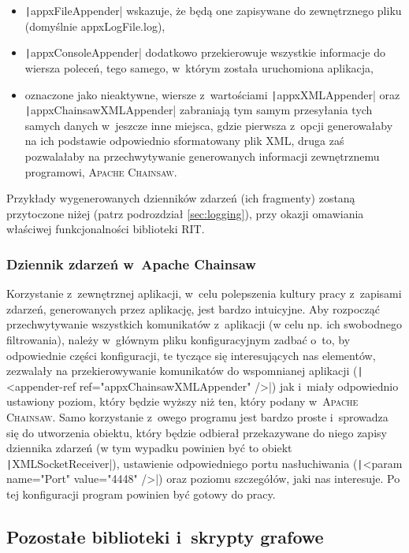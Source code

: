 \begin{itemize}
	\item \texttt|appxFileAppender| wskazuje, że będą one zapisywane do zewnętrznego pliku (domyślnie \textsf{appxLogFile.log}),
	\item \texttt|appxConsoleAppender|  dodatkowo przekierowuje wszystkie informacje do wiersza poleceń, tego samego, w~którym została uruchomiona aplikacja,
	\item oznaczone jako nieaktywne, wiersze z~wartościami \texttt|appxXMLAppender| oraz \texttt|appxChainsawXMLAppender| zabraniają tym samym przesyłania tych samych danych w~jeszcze inne miejsca, gdzie pierwsza z~opcji generowałaby na ich podstawie odpowiednio sformatowany plik \textsc{XML}, druga zaś pozwalałaby na przechwytywanie generowanych informacji zewnętrznemu programowi, \textsc{Apache Chainsaw}.
\end{itemize}

Przykłady wygenerowanych dzienników zdarzeń (ich fragmenty) zostaną przytoczone niżej (patrz podrozdział \ref{sec:logging}), przy okazji omawiania właściwej funkcjonalności biblioteki \textsc{RIT}.

\subsubsection{Dziennik zdarzeń w~Apache Chainsaw}

Korzystanie z~zewnętrznej aplikacji, w~celu polepszenia kultury pracy z~zapisami zdarzeń, generowanych przez aplikację, jest bardzo intuicyjne. Aby rozpocząć przechwytywanie wszystkich komunikatów z~aplikacji (w celu np. ich swobodnego filtrowania), należy w~głównym pliku konfiguracyjnym zadbać o~to, by odpowiednie części konfiguracji, te tyczące się interesujących nas elementów, zezwalały na przekierowywanie komunikatów do wspomnianej aplikacji (\texttt|<appender-ref ref="appxChainsawXMLAppender" />|) jak i~miały odpowiednio ustawiony poziom, który będzie wyższy niż ten, który podany w~\textsc{Apache Chainsaw}. Samo korzystanie z~owego programu jest bardzo proste i~sprowadza się do utworzenia obiektu, który będzie odbierał przekazywane do niego zapisy dziennika zdarzeń (w tym wypadku powinien być to obiekt \texttt|XMLSocketReceiver|), ustawienie odpowiedniego portu nasłuchiwania (\texttt|<param name="Port" value="4448" />|) oraz poziomu szczegółów, jaki nas interesuje. Po tej konfiguracji program powinien być gotowy do pracy.

\subsection{Pozostałe biblioteki i~skrypty grafowe}

